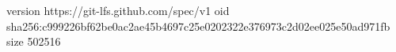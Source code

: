 version https://git-lfs.github.com/spec/v1
oid sha256:c999226bf62be0ac2ae45b4697c25e0202322e376973c2d02ee025e50ad971fb
size 502516
